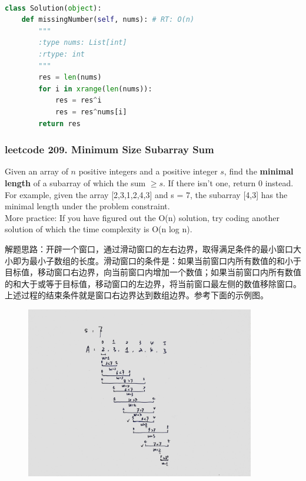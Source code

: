 \documentclass[a4paper,10pt]{article}
\begin{document}
\begin{lstlisting}[language=Python, caption=Problem268. Missing Number]

class Solution(object):
    def missingNumber(self, nums): # RT: O(n)
        """
        :type nums: List[int]
        :rtype: int
        """
        res = len(nums)
        for i in xrange(len(nums)):
            res = res^i
            res = res^nums[i]
        return res
\end{lstlisting}


\subsubsection{leetcode 209. Minimum Size Subarray Sum}
Given an array of $n$ positive integers and a positive integer $s$, find the \textbf{minimal length} of a subarray of which the sum $\geq s$. If there isn't one, return 0 instead. \\

\noindent For example, given the array [2,3,1,2,4,3] and s = 7, the subarray [4,3] has the minimal length under the problem constraint. \\

\noindent More practice: If you have figured out the O(n) solution, try coding another solution of which the time complexity is O(n log n). \\

\begin{CJK*}{UTF8}{gbsn}
\noindent 解题思路：开辟一个窗口，通过滑动窗口的左右边界，取得满足条件的最小窗口大小即为最小子数组的长度。滑动窗口的条件是：如果当前窗口内所有数值的和小于目标值，移动窗口右边界，向当前窗口内增加一个数值；如果当前窗口内所有数值的和大于或等于目标值，移动窗口的左边界，将当前窗口最左侧的数值移除窗口。上述过程的结束条件就是窗口右边界达到数组边界。参考下面的示例图。
\end{CJK*}

\begin{figure}[h]
    \includegraphics[width=10cm]{leetcode209.jpg}
    \centering \\
\end{figure}
\end{document}
